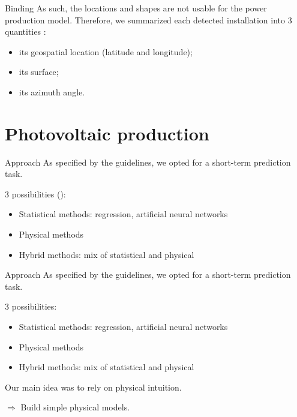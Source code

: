\documentclass[12pt]{beamer}
\begin{document}
\begin{frame}{Binding}
    As such, the locations and shapes are not usable for the power production model. Therefore, we summarized each detected installation into \alert{3 quantities} :
    \begin{itemize}
        \item its geospatial location (latitude and longitude);
        \item its surface;
        \item its azimuth angle.
    \end{itemize}
\end{frame}

\section{Photovoltaic production}
\begin{frame}{Approach}
    As specified by the guidelines, we opted for a \alert{short-term} prediction task.
    
    3 possibilities (\cite{nespoli2019day}):
    \begin{itemize}
        \item Statistical methods: regression, artificial neural networks
        \item Physical methods
        \item Hybrid methods: mix of statistical and physical
    \end{itemize}
\end{frame}

\begin{frame}{Approach}
    As specified by the guidelines, we opted for a \alert{short-term} prediction task.
    
    3 possibilities:
    \begin{itemize}
        \item Statistical methods: regression, artificial neural networks
        \item \alert{Physical methods}
        \item Hybrid methods: mix of statistical and physical
    \end{itemize}

    Our main idea was to rely on physical \alert{intuition}.
    
    $\Rightarrow$ Build \alert{simple} physical models.
\end{frame}
\end{document}
